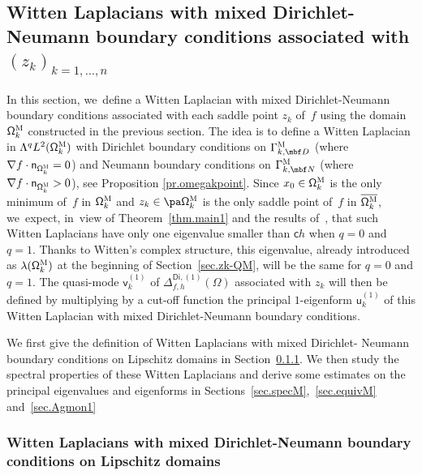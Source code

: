 \subsection{Witten Laplacians with mixed Dirichlet-Neumann boundary conditions associated with $(z_k)_{k=1,\ldots,n}$}
\label{sec.Witten-TN}

In this section, we~define a Witten Laplacian with mixed Dirichlet-Neumann boundary conditions associated with each saddle point $z_k$ of~$f$ using the domain $\mathsf \Omega_k^{\textsc{M}}$ constructed in the previous section. The idea is to define a Witten Laplacian in $\Lambda^qL^2(\mathsf \Omega_k^{\textsc{M}})$ with
Dirichlet boundary conditions on $\Gamma_{k,\mbf D}^{\textsc{M}}$ (where $ \nabla f\cdot \mathsf n_{ \mathsf \Omega_k^{\textsc{M}} } =0$) and Neumann boundary conditions on $\Gamma_{k,\mbf N}^{\textsc{M}}$ (where $ \nabla f\cdot \mathsf n_{ \mathsf \Omega_k^{\textsc{M}} } >0$), see Proposition \ref{pr.omegakpoint}. Since $x_0\in \mathsf \Omega_k^{\textsc{M}}$ is the only minimum of~$f$ in $\mathsf \Omega_k^{\textsc{M}}$ and $z_k\in \pa \mathsf \Omega_k^{\textsc{M}}$ is the only saddle point of~$f$ in $\overline{ \mathsf \Omega_k^{\textsc{M}}}$, we~expect, in~view of Theorem~\ref{thm.main1} and the results of~\cite{le-peutrec-10}, that such Witten Laplacians have only one eigenvalue smaller than $\mathsf ch$ when $q=0$ and $q=1$.
Thanks to Witten's complex structure,
this eigenvalue, already introduced as $\lambda(\mathsf
\Omega_k^{\textsc{M}})$ at the beginning of Section~\ref{sec.zk-QM},
will be the same for $q=0$ and $q=1$. The quasi-mode $\mathsf
v_k^{(1)} $ of $\Delta_{f,h}^{\mathsf{Di},(1)}(\Omega)$ associated
with $z_k$ will then be defined by multiplying by a cut-off function the principal $1$-eigenform $\mathsf u_k^{(1)}$ of this Witten Laplacian with mixed Dirichlet-Neumann boundary conditions.

We first give the definition of Witten Laplacians with mixed
Dirichlet- Neumann boundary conditions on
Lipschitz domains in Section~\ref{sec.Witten-general-result}. We
then study the spectral properties of these Witten Laplacians and
derive some estimates on the principal eigenvalues and eigenforms in
Sections~\ref{sec.specM},~\ref{sec.equivM} and~\ref{sec.Agmon1}

\subsubsection{Witten Laplacians with mixed
Dirichlet-Neumann boundary conditions on Lipschitz domains}
\label{sec.Witten-general-result}

